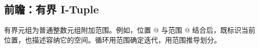 \subsection*{前瞻：有界 I-Tuple}

有界元组为普通整数元组附加范围。例如，位置 @ 与范围 \co@[4, 8]@ 结合后，既标识当前位置，也描述容纳它的空间。循环用范围确定迭代，\co@chunkat@ 用范围推导划分。
